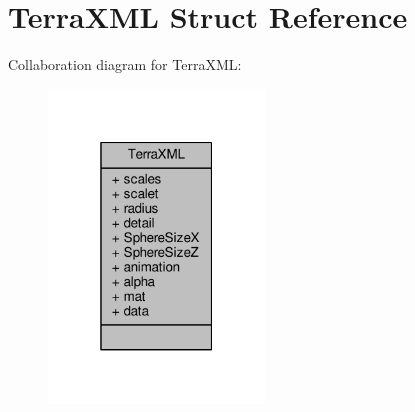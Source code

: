 \hypertarget{structTerraXML}{}\section{Terra\+X\+ML Struct Reference}
\label{structTerraXML}


Collaboration diagram for Terra\+X\+ML\+:
\nopagebreak
\begin{figure}[H]
\begin{center}
\leavevmode
\includegraphics[width=163pt]{d0/d04/structTerraXML__coll__graph}
\end{center}
\end{figure}
